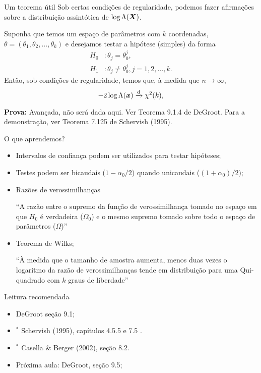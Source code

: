 \begin{frame}{Um teorema útil}
 Sob certas condições de regularidade, podemos fazer afirmações sobre a distribuição assintótica de $\log\Lambda(\boldsymbol{X})$.
 \begin{theo}
 \label{thm:Wilks}
  Suponha que temos um espaço de parâmetros com $k$ coordenadas, $\theta = (\theta_1, \theta_2, \ldots, \theta_k)$ e desejamos testar a hipótese (simples) da forma
   \begin{align*}
   H_0 &:  \theta_j = \theta_0^{j}, \\
   H_1 &:  \theta_j \neq \theta_0^{j}, j = 1, 2, \ldots, k. 
  \end{align*}
  Então, sob condições de regularidade, temos que, à medida que $n \to \infty$,
  \begin{equation*}
   -2\log\Lambda(\boldsymbol{x}) \xrightarrow{\text{d}} \chi^{2} (k), 
  \end{equation*}
 \end{theo}
\textbf{Prova:} Avançada, não será dada aqui.
Ver Teorema 9.1.4 de DeGroot.
Para a demonstração, ver Teorema 7.125 de Schervish (1995).
\end{frame}

\begin{frame}{O que aprendemos?}
\begin{itemize}

  \item[\faLightbulbO] Intervalos de confiança podem ser utilizados para testar hipóteses;
  \item[\faLightbulbO] Testes podem ser bicaudais ($1-\alpha_0/2$) quando unicaudais ($(1 + \alpha_0)/2)$;
  \item[\faLightbulbO] Razões de verossimilhanças
  
  ``A razão entre o supremo da função de verossimilhança tomado no espaço em que $H_0$ é verdadeira ($\Omega_0$) e o mesmo supremo tomado sobre todo o espaço de parâmetros ($\Omega$)''
  
  \item[\faLightbulbO] Teorema de Wilks; 
  
  ``À medida que o tamanho de amostra aumenta, menos duas vezes o logaritmo da razão de verossimilhanças tende em distribuição para uma Qui-quadrado com $k$ graus de liberdade''
  \end{itemize}
 \end{frame}

\begin{frame}{Leitura recomendada}
\begin{itemize}
 \item[\faBook] DeGroot seção 9.1;
 \item[\faBook] $^\ast$ Schervish (1995), capítulos 4.5.5 e 7.5 .
 \item[\faBook] $^\ast$ Casella \& Berger (2002), seção 8.2.
 \item[\faForward] Próxima aula: DeGroot, seção 9.5;
 \end{itemize} 
\end{frame}
